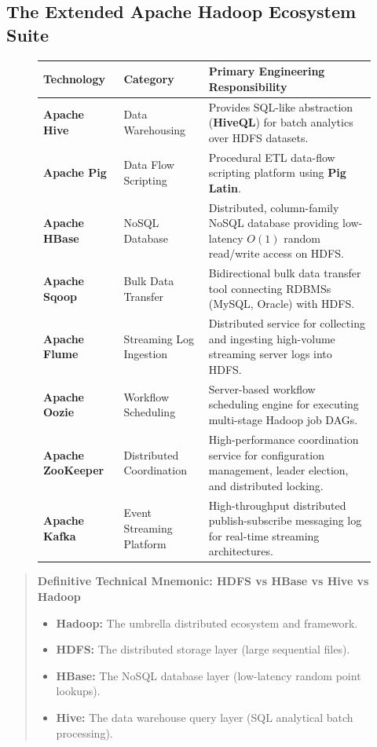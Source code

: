 \subsection{The Extended Apache Hadoop Ecosystem Suite}
\begin{figure}[htbp]
\centering
\small
\begin{tabularx}{\textwidth}{l p{3.2cm} X}
\toprule
\textbf{Technology} & \textbf{Category} & \textbf{Primary Engineering Responsibility} \\
\midrule
\textbf{Apache Hive} & Data Warehousing & Provides SQL-like abstraction (\textbf{HiveQL}) for batch analytics over HDFS datasets. \\
\textbf{Apache Pig} & Data Flow Scripting & Procedural ETL data-flow scripting platform using \textbf{Pig Latin}. \\
\textbf{Apache HBase} & NoSQL Database & Distributed, column-family NoSQL database providing low-latency $O(1)$ random read/write access on HDFS. \\
\textbf{Apache Sqoop} & Bulk Data Transfer & Bidirectional bulk data transfer tool connecting RDBMSs (MySQL, Oracle) with HDFS. \\
\textbf{Apache Flume} & Streaming Log Ingestion & Distributed service for collecting and ingesting high-volume streaming server logs into HDFS. \\
\textbf{Apache Oozie} & Workflow Scheduling & Server-based workflow scheduling engine for executing multi-stage Hadoop job DAGs. \\
\textbf{Apache ZooKeeper} & Distributed Coordination & High-performance coordination service for configuration management, leader election, and distributed locking. \\
\textbf{Apache Kafka} & Event Streaming Platform & High-throughput distributed publish-subscribe messaging log for real-time streaming architectures. \\
\bottomrule
\end{tabularx}
\end{figure}

\begin{quote}
\textbf{Definitive Technical Mnemonic: HDFS vs HBase vs Hive vs Hadoop}
\begin{itemize}
    \item \textbf{Hadoop:} The umbrella distributed ecosystem and framework.
    \item \textbf{HDFS:} The distributed storage layer (large sequential files).
    \item \textbf{HBase:} The NoSQL database layer (low-latency random point lookups).
    \item \textbf{Hive:} The data warehouse query layer (SQL analytical batch processing).
\end{itemize}
\end{quote}



